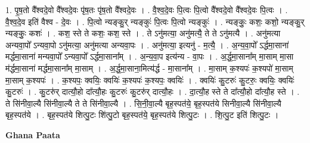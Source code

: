\documentclass[17pt]{extarticle}
\begin{document}
1. पृ॒ष॒तो वै᳚श्वदे॒वो वै᳚श्वदे॒वः पृ॑ष॒तः पृ॑ष॒तो वै᳚श्वदे॒वः । . वै॒श्व॒दे॒वः पि॒त्वः पि॒त्वो वै᳚श्वदे॒वो वै᳚श्वदे॒वः पि॒त्वः । . वै॒श्व॒दे॒व इति॑ वैश्व - दे॒वः । . पि॒त्वो न्यङ्कु॒र् न्यङ्कुः॑ पि॒त्वः पि॒त्वो न्यङ्कुः॑ । . न्यङ्कुः॒ कशः॒ कशो॒ न्यङ्कु॒र् न्यङ्कुः॒ कशः॑ । . कश॒ स्ते ते कशः॒ कश॒ स्ते । . ते ऽनु॑मत्या॒ अनु॑मत्यै॒ ते ते ऽनु॑मत्यै । . अनु॑मत्या अन्यवा॒पो᳚ ऽन्यवा॒पो ऽनु॑मत्या॒ अनु॑मत्या अन्यवा॒पः । . अनु॑मत्या॒ इत्यनु॑ - म॒त्यै॒ । . अ॒न्य॒वा॒पो᳚ ऽर्द्धमा॒साना॑ मर्द्धमा॒साना॑ मन्यवा॒पो᳚ ऽन्यवा॒पो᳚ ऽर्द्धमा॒साना᳚म् । . अ॒न्य॒वा॒प इत्य॑न्य - वा॒पः । . अ॒र्द्ध॒मा॒साना᳚म् मा॒साम् मा॒सा म॑र्द्धमा॒साना॑ मर्द्धमा॒साना᳚म् मा॒साम् । . अ॒र्द्ध॒मा॒साना॒मित्य॑र्द्ध - मा॒साना᳚म् । . मा॒साम् क॒श्यपः॑ क॒श्यपो॑ मा॒साम् मा॒साम् क॒श्यपः॑ । . क॒श्यपः॒ क्वयिः॒ क्वयिः॑ क॒श्यपः॑ क॒श्यपः॒ क्वयिः॑ । . क्वयिः॑ कु॒टरुः॑ कु॒टरुः॒ क्वयिः॒ क्वयिः॑ कु॒टरुः॑ । . कु॒टरु॑र् दात्यौ॒हो दा᳚त्यौ॒हः कु॒टरुः॑ कु॒टरु॑र् दात्यौ॒हः । . दा॒त्यौ॒ह स्ते ते दा᳚त्यौ॒हो दा᳚त्यौ॒ह स्ते । . ते सि॑नीवा॒ल्यै सि॑नीवा॒ल्यै ते ते सि॑नीवा॒ल्यै । . सि॒नी॒वा॒ल्यै बृह॒स्पत॑ये॒ बृह॒स्पत॑ये सिनीवा॒ल्यै सि॑नीवा॒ल्यै बृह॒स्पत॑ये । . बृह॒स्पत॑ये शित्पु॒टः शि॑त्पु॒टो बृह॒स्पत॑ये॒ बृह॒स्पत॑ये शित्पु॒टः । . शि॒त्पु॒ट इति॑ शित्पु॒टः । \newline

\textbf{Ghana Paata } \newline
\end{document}
